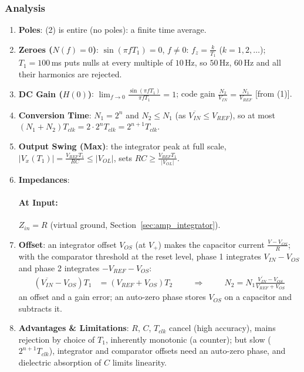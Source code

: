 \subsubsection{Analysis}
\begin{enumerate}
  \item \textbf{Poles}: (2) is entire (no poles): a finite time average.
  \item \textbf{Zeroes (\(N(f) = 0\))}: \(\sin(\pi f T_1) = 0\), \(f \neq 0\): \(f_z = \frac{k}{T_1}\) (\(k = 1, 2, \ldots\)); \(T_1 = 100\,\)ms puts
    nulls at every multiple of \(10\,\)Hz, so \(50\,\)Hz, \(60\,\)Hz and all their harmonics are rejected.
  \item \textbf{DC Gain (\(H(0)\))}: \(\lim_{f \to 0}\frac{\sin(\pi f T_1)}{\pi f T_1} = 1\); code gain \(\frac{N_2}{V_{IN}} = \frac{N_1}{V_{REF}}\) [from (1)].
  \item \textbf{Conversion Time}: \(N_1 = 2^n\) and \(N_2 \leq N_1\) (as
    \(\overline{V_{IN}} \leq V_{REF}\)), so at most \((N_1 + N_2) T_{clk} = 2 \cdot 2^n T_{clk} = 2^{n+1} T_{clk}\).
  \item \textbf{Output Swing (Max)}: the integrator peak at full scale,
    \(|V_x(T_1)| = \frac{V_{REF} T_1}{RC} \leq |V_{OL}|\), sets \(RC \geq \frac{V_{REF} T_1}{|V_{OL}|}\).
  \item \textbf{Impedances}:
    \paragraph{At Input:} \(Z_{in} = R\) (virtual ground, Section~\ref{sec:amp_integrator}).
  \item \textbf{Offset}: an integrator offset \(V_{OS}\) (at \(V_+\)) makes the capacitor current \(\frac{V - V_{OS}}{R}\); with the
    comparator threshold at the reset level, phase 1 integrates \(V_{IN} - V_{OS}\) and phase 2 integrates \(-V_{REF} - V_{OS}\):
    \begin{align*}
      (\overline{V_{IN}} - V_{OS})T_1 &= (V_{REF} + V_{OS})T_2 \hspace{1cm} \Rightarrow \hspace{1cm} N_2 = N_1\frac{\overline{V_{IN}} - V_{OS}}{V_{REF} + V_{OS}}
    \end{align*}
    an offset and a gain error; an auto-zero phase stores \(V_{OS}\) on a capacitor and subtracts it.
  \item \textbf{Advantages \& Limitations}: \(R\), \(C\), \(T_{clk}\) cancel (high accuracy), mains rejection by
    choice of \(T_1\), inherently monotonic (a counter); but slow (\(2^{n+1} T_{clk}\)), integrator and
    comparator offsets need an auto-zero phase, and dielectric absorption of \(C\) limits linearity.
\end{enumerate}

